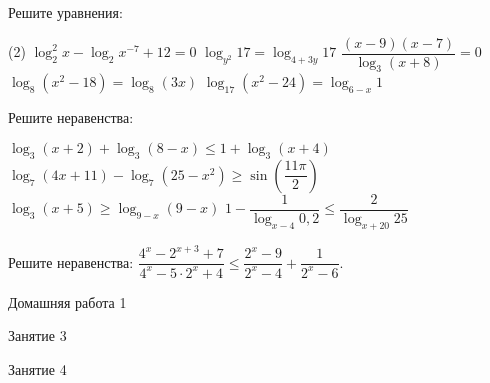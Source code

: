 \begin{class}[number=2]
	\begin{listofex}
		\item Решите уравнения: %
		\begin{tasks}(2)
			\task \( \log_2^2 x - \log_2 x^{-7} + 12 = 0 \)
			\task \( \log_{y^2}17=\log_{4+3y}17 \)
			\task \( \dfrac{ (x-9)(x-7) }{ \log_3(x+8) }=0 \)
			\task \( \log_8(x^2-18)=\log_8(3x) \)
			\task \( \log_{17}(x^2-24)=\log_{6-x}1 \)
		\end{tasks}
		\item Решите неравенства: %
		\begin{tasks}
			\task \( \log_3(x+2)+\log_3(8-x)\le 1 + \log_3(x+4) \)
			\task \( \log_7(4x+11)-\log_7(25-x^2)\ge \sin \left( \dfrac{ 11\pi }{ 2 } \right) \)
			\task \( \log_3(x+5) \ge \log_{9-x}(9-x) \)
			\task \( 1-\dfrac{ 1 }{ \log_{x-4}0,2 } \le \dfrac{ 2 }{ \log_{x+20}25 } \)
		\end{tasks}
		\item Решите неравенства: \( \dfrac{ 4^x-2^{x+3}+7 }{ 4^x-5\cdot 2^x+4 } \le \dfrac{ 2^x-9 }{ 2^x-4 }+\dfrac{ 1 }{ 2^x-6 } \).
	\end{listofex}
\end{class}

\begin{homework}[number=1]
	\begin{listofex}
		\item Домашняя работа 1
	\end{listofex}
\end{homework}

\begin{class}[number=3]
	\begin{listofex}
		\item Занятие 3 
	\end{listofex}
\end{class}

\begin{class}[number=4]
	\begin{listofex}
		\item Занятие 4
	\end{listofex}
\end{class}

